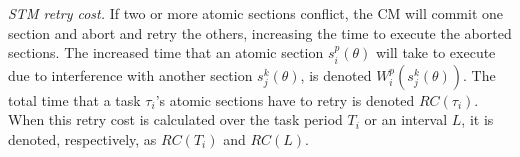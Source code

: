 \textit{STM retry cost.} If two or more atomic sections conflict, the CM will commit one section and abort and retry the others, increasing the time to execute the aborted sections. The increased time that an atomic section $s_i^p (\theta)$ will take to execute due to interference with another section $s_j^k (\theta)$, is denoted $W_{i}^{p}(s_{j}^{k}(\theta))$. The total time that a task $\tau_i$'s atomic sections have to retry is denoted $RC(\tau_i)$.
When this retry cost is calculated over the task period $T_i$ or an interval $L$, it is denoted, respectively, as $RC(T_i)$ and $RC(L)$.